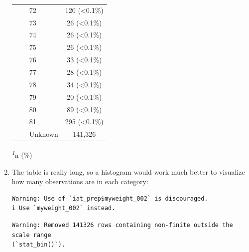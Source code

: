 \documentclass[
  letterpaper,
  DIV=11,
  numbers=noendperiod]{scrartcl}
\newenvironment{Shaded}{\begin{snugshade}}{\end{snugshade}}
\newcommand{\AttributeTok}[1]{\textcolor[rgb]{0.40,0.45,0.13}{#1}}
\newcommand{\DecValTok}[1]{\textcolor[rgb]{0.68,0.00,0.00}{#1}}
\newcommand{\FunctionTok}[1]{\textcolor[rgb]{0.28,0.35,0.67}{#1}}
\newcommand{\NormalTok}[1]{\textcolor[rgb]{0.00,0.23,0.31}{#1}}
\newcommand{\SpecialCharTok}[1]{\textcolor[rgb]{0.37,0.37,0.37}{#1}}
\newcommand{\StringTok}[1]{\textcolor[rgb]{0.13,0.47,0.30}{#1}}
\begin{document}
\begin{enumerate}
\begin{table}
\begin{tabular*}{\linewidth}{@{\extracolsep{\fill}}lc}
      72 & 120 (<0.1\%) \\ 
      73 & 26 (<0.1\%) \\ 
      74 & 26 (<0.1\%) \\ 
      75 & 26 (<0.1\%) \\ 
      76 & 33 (<0.1\%) \\ 
      77 & 28 (<0.1\%) \\ 
      78 & 34 (<0.1\%) \\ 
      79 & 20 (<0.1\%) \\ 
      80 & 89 (<0.1\%) \\ 
      81 & 295 (<0.1\%) \\ 
      Unknown & 141,326 \\ 
  \bottomrule
  \end{tabular*}
  \begin{minipage}{\linewidth}
  \textsuperscript{\textit{1}}n (\%)\\
  \end{minipage}
  \end{table}
\item
  The table is really long, so a histogram would work much better to
  visualize how many observations are in each category:

\begin{Shaded}
\end{Shaded}

\begin{verbatim}
Warning: Use of `iat_prep$myweight_002` is discouraged.
i Use `myweight_002` instead.
\end{verbatim}

\begin{verbatim}
Warning: Removed 141326 rows containing non-finite outside the scale range
(`stat_bin()`).
\end{verbatim}


\end{enumerate}
\end{document}

